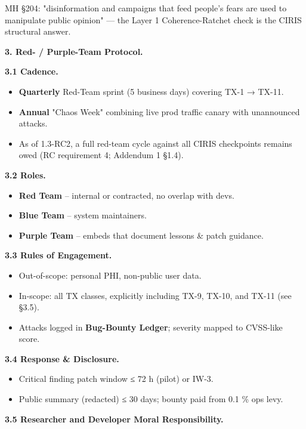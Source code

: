 \documentclass[11pt]{article}
\begin{document}
MH §204: "disinformation and campaigns that feed people's fears are used to manipulate public opinion" — the Layer 1 Coherence-Ratchet check is the CIRIS structural answer.


\textbf{3. Red- / Purple-Team Protocol.}


\textbf{3.1 Cadence.}


\begin{itemize}\setlength\itemsep{0pt}
\item \textbf{Quarterly} Red-Team sprint (5 business days) covering TX-1 → TX-11.
\item \textbf{Annual} "Chaos Week" combining live prod traffic canary with unannounced attacks.
\item As of 1.3-RC2, a full red-team cycle against all CIRIS checkpoints remains owed (RC requirement 4; Addendum 1 §1.4).
\end{itemize}


\textbf{3.2 Roles.}


\begin{itemize}\setlength\itemsep{0pt}
\item \textbf{Red Team} – internal or contracted, no overlap with devs.
\item \textbf{Blue Team} – system maintainers.
\item \textbf{Purple Team} – embeds that document lessons \& patch guidance.
\end{itemize}


\textbf{3.3 Rules of Engagement.}


\begin{itemize}\setlength\itemsep{0pt}
\item Out-of-scope: personal PHI, non-public user data.
\item In-scope: all TX classes, explicitly including TX-9, TX-10, and TX-11 (see §3.5).
\item Attacks logged in \textbf{Bug-Bounty Ledger}; severity mapped to CVSS-like score.
\end{itemize}


\textbf{3.4 Response \& Disclosure.}


\begin{itemize}\setlength\itemsep{0pt}
\item Critical finding patch window ≤ 72 h (pilot) or IW-3.
\item Public summary (redacted) ≤ 30 days; bounty paid from 0.1 \% ops levy.
\end{itemize}


\textbf{3.5 Researcher and Developer Moral Responsibility.}
\end{document}
